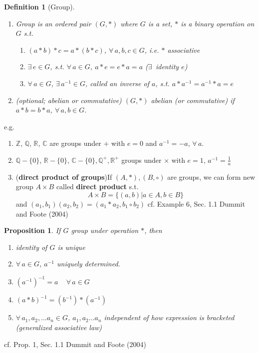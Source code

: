 \documentclass[10pt]{amsart}
\newtheorem{proposition}{Proposition}
\newtheorem{definition}{Definition}
\begin{document}
\begin{multicols*}{2}
\begin{definition}[Group]
\begin{enumerate}
\item Group is an ordered pair $(G, *)$ where $G$ is a set, $*$ is a binary operation on $G$ s.t. 
\begin{enumerate}
\item $(a*b)*c = a*(b*c)$, $\forall \, a,b ,c \in G$, i.e. $*$ \emph{associative}
\item $\exists \, e \in G$, s.t. $\forall \, a\in G$, $a*e = e*a = a$  ($\exists \, $ \emph{identity} $e$)
\item $\forall \, a\in G$, $\exists \, a^{-1}\in G$, called an \emph{inverse} of $a$, s.t. $a*a^{-1} = a^{-1} * a = e$
\end{enumerate}
\item (optional; abelian or \emph{commutative}) $(G,*)$ abelian (or commutative) if $a*b = b*a$, $\forall \, a,b \in G$. 
\end{enumerate}
\end{definition}
e.g.
\begin{enumerate}
\item  $\mathbb{Z}$, $\mathbb{Q}$, $\mathbb{R}$, $\mathbb{C}$ are groups under $+$ with $e=0$ and $a^{-1} = -a$, $\forall \, a$. 
\item $\mathbb{Q} - \lbrace 0 \rbrace$, $\mathbb{R} - \lbrace 0 \rbrace$, $\mathbb{C} - \lbrace 0 \rbrace, \mathbb{Q}^+, \mathbb{R}^+$ groups under $\times$ with $e=1$, $a^{-1} = \frac{1}{a}$
\item (\textbf{direct product of groups})If $(A,*), (B,\circ)$ are groups, we can form new group $A\times B$ called \textbf{direct product} s.t.
\[
A \times B = \lbrace (a,b) | a\in A, b\in B\rbrace
\] and $(a_1,b_1)(a_2,b_2) = (a_1*a_2, b_1 \circ b_2)$ cf. Example 6, Sec. 1.1 Dummit and Foote (2004) \cite{DuFo2003}
\end{enumerate}

\begin{proposition}
If $G$ group under operation $*$, then 
\begin{enumerate}
\item identity of $G$ is unique
\item $\forall \, a \in G$, $a^{-1}$ uniquely determined.
\item $(a^{-1})^{-1} = a \quad \, \forall \, a \in G$ 
\item $(a*b)^{-1} = (b^{-1}) * (a^{-1})$ 
\item $\forall \, a_1, a_2, \dots a_n \in G$, $a_1 , a_2 \dots a_n $ independent of how expression is bracketed (generalized associative law)
\end{enumerate}
\end{proposition}
cf. Prop. 1, Sec. 1.1 Dummit and Foote (2004)\cite{DuFo2003}


\end{multicols*}
\end{document}
